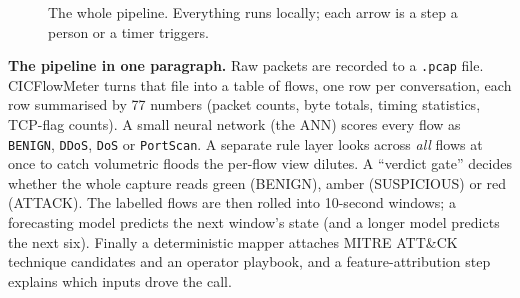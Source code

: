 \documentclass[11pt,a4paper]{article}
\begin{document}
\begin{figure}[H]
\centering
{}
\caption{The whole pipeline. Everything runs locally; each arrow is a step a
person or a timer triggers.}
\end{figure}

\textbf{The pipeline in one paragraph.} Raw packets are recorded to a
\texttt{.pcap} file. CICFlowMeter turns that file into a table of flows, one row
per conversation, each row summarised by 77 numbers (packet counts, byte totals,
timing statistics, TCP-flag counts). A small neural network (the ANN) scores
every flow as \texttt{BENIGN}, \texttt{DDoS}, \texttt{DoS} or \texttt{PortScan}.
A separate rule layer looks across \emph{all} flows at once to catch volumetric
floods the per-flow view dilutes. A ``verdict gate'' decides whether the whole
capture reads green (BENIGN), amber (SUSPICIOUS) or red (ATTACK). The labelled
flows are then rolled into 10-second windows; a forecasting model predicts the
next window's state (and a longer model predicts the next six). Finally a
deterministic mapper attaches MITRE ATT\&CK technique candidates and an
operator playbook, and a feature-attribution step explains which inputs drove
the call.
\end{document}
